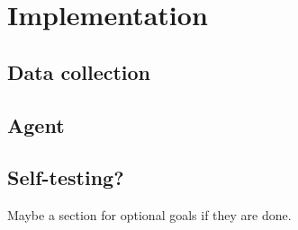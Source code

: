 \chapter{Implementation\label{chap:implementation}}

\section{Data collection}
\em{}

\section{Agent}
\em{}

\section{Self-testing?}
\em{}

Maybe a section for optional goals if they are done.
